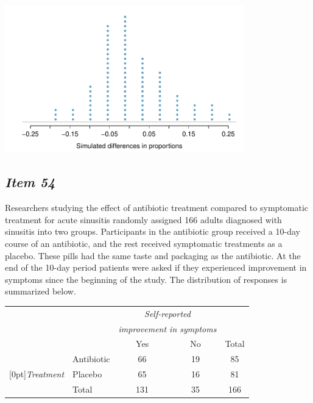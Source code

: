 \begin{center}


\includegraphics[width = 0.78\textwidth]{includes/heartTr_RandHist} \\


\end{center}





\subsection{\textbf{\textit{Item 54}}}








Researchers studying the effect of antibiotic treatment compared to symptomatic treatment for acute sinusitis randomly assigned 166 adults diagnosed with sinusitis into two groups. Participants in the antibiotic group received a 10-day course of an antibiotic, and the rest received symptomatic treatments as a placebo. These pills had the same taste and packaging as the antibiotic. At the end of the 10-day period patients were asked if they experienced improvement in symptoms since the beginning of the study. The distribution of responses is summarized below. 


\begin{center}


\begin{tabular}{ll cc c} 


& & \multicolumn{2}{c}{\textit{Self-reported}} \\


& & \multicolumn{2}{c}{\textit{improvement in symptoms}} \\


\cline{3-4}


& & Yes & No & Total \\


\cline{2-5}


&Antibiotic & 66 & 19 & 85 \\


\raisebox{1.5ex}[0pt]{\textit{Treatment}} & Placebo & 65 & 16 & 81 \\


\cline{2-5}


&Total & 131 & 35 & 166


\end{tabular}


\end{center}


